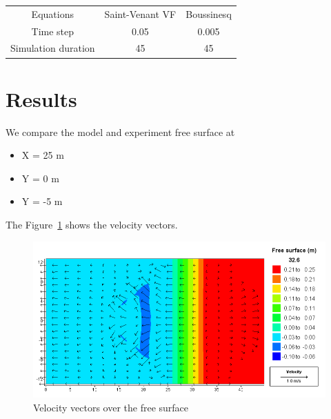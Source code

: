 \begin{table}[H]
  \begin{center}

    \begin{tabular*}{.9\textwidth}{|c|c|c|}
  \hline
  Equations & Saint-Venant VF & Boussinesq \\
  Time step & 0.05 & 0.005 \\
  Simulation duration & 45 & 45 \\
  \hline
\end{tabular*}
  \end{center}
\end{table}

\section{Results}
We compare the model and experiment free surface at
\begin{itemize}
  \item X = 25 m
  \item Y =  0 m
  \item Y = -5 m
\end{itemize}

The Figure~\ref{fig:triang:vel} shows the velocity vectors.
\begin{figure}
\centering
\includegraphics[width=.6\textwidth]{img/vel.png}
\caption{Velocity vectors over the free surface}\label{fig:triang:vel}
\end{figure}

